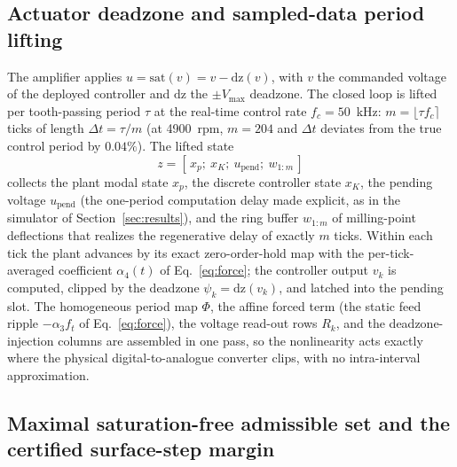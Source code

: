 \documentclass[preprint,12pt]{elsarticle}
\begin{document}
\subsection{Actuator deadzone and sampled-data period lifting}
\label{sec:satlift}

The amplifier applies $u = \mathrm{sat}(v) = v - \mathrm{dz}(v)$, with
$v$ the commanded voltage of the deployed controller and $\mathrm{dz}$
the $\pm V_{\max}$ deadzone. The closed loop is lifted per tooth-passing
period $\tau$ at the real-time control rate $f_c = 50$~kHz:
$m = \lfloor \tau f_c \rceil$ ticks of length $\Delta t = \tau/m$ (at
4900~rpm, $m = 204$ and $\Delta t$ deviates from the true control period
by $0.04\%$). The lifted state
\begin{equation}
z = [\,x_p;\ x_K;\ u_{\mathrm{pend}};\ w_{1:m}\,]
\label{eq:liftstate}
\end{equation}
collects the plant modal state $x_p$, the discrete controller state
$x_K$, the pending voltage $u_{\mathrm{pend}}$ (the one-period
computation delay made explicit, as in the simulator of
Section~\ref{sec:results}), and the ring buffer $w_{1:m}$ of
milling-point deflections that realizes the regenerative delay of
exactly $m$ ticks. Within each tick the plant advances by its exact
zero-order-hold map with the per-tick-averaged coefficient
$\alpha_4(t)$ of Eq.~\eqref{eq:force}; the controller output $v_k$ is
computed, clipped by the deadzone $\psi_k = \mathrm{dz}(v_k)$, and
latched into the pending slot. The homogeneous period map $\Phi$, the
affine forced term (the static feed ripple $-\alpha_3 f_t$ of
Eq.~\eqref{eq:force}), the voltage read-out rows $R_k$, and the
deadzone-injection columns are assembled in one pass, so the
nonlinearity acts exactly where the physical digital-to-analogue
converter clips, with no intra-interval approximation.

\subsection{Maximal saturation-free admissible set and the certified
surface-step margin}
\label{sec:oinf}
\end{document}
